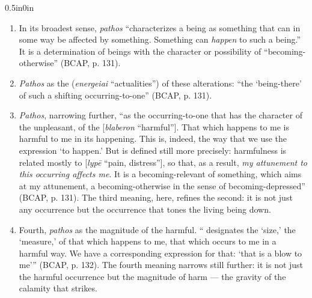 \begin{adjustwidth}{0.5in}{0in}
\begin{enumerate}
\item In its broadest sense, \textit{pathos} ``characterizes a being as something that can in some way be affected by something. Something can \textit{happen} to such a being.'' It is a determination of beings with the character or possibility of ``becoming-otherwise'' (BCAP, p. 131).
\item \textit{Pathos} as the  (\textit{energeiai} ``actualities'') of these alterations: ``the `being-there' of such a shifting occurring-to-one'' (BCAP, p. 131).
\item \textit{Pathos}, narrowing further, ``as the occurring-to-one that has the character of the unpleasant, of the  [\textit{blaberon} ``harmful'']. That which happens to me is harmful to me in its happening. This is, indeed, the way that we use the expression `to happen.' But  is defined still more precisely: harmfulness is related mostly to  [\textit{lypē} ``pain, distress''], so that, as a result, \textit{my attunement to this occurring affects me}. It is a becoming-relevant of something, which aims at my attunement, a becoming-otherwise in the sense of becoming-depressed'' (BCAP, p. 131). The third meaning, here, refines the second: it is not just any occurrence but the occurrence that tones the living being down.
\item Fourth, \textit{pathos} as the magnitude of the harmful. `` designates the `size,' the `measure,' of that which happens to me, that which occurs to me in a harmful way. We have a corresponding expression for that: `that is a blow to me''' (BCAP, p. 132). The fourth meaning narrows still further: it is not just the harmful occurrence but the magnitude of harm --- the gravity of the calamity that strikes.
\end{enumerate}
\end{adjustwidth}

